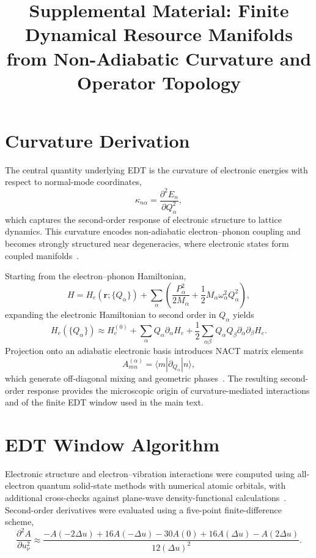 ﻿\documentclass[aps,prx,reprint,superscriptaddress,longbibliography,floatfix]{revtex4-2}
\begin{document}
\title{Supplemental Material: Finite Dynamical Resource Manifolds from Non-Adiabatic Curvature and Operator Topology}

\maketitle
\section{Curvature Derivation}

The central quantity underlying EDT is the curvature of electronic energies with respect to normal-mode coordinates,
\begin{equation}
\kappa_{n\alpha} = \frac{\partial^2 E_n}{\partial Q_\alpha^2},
\end{equation}
which captures the second-order response of electronic structure to lattice dynamics. This curvature encodes non-adiabatic electron--phonon coupling and becomes strongly structured near degeneracies, where electronic states form coupled manifolds~\cite{Giustino2017,Yarkony1996}.

Starting from the electron--phonon Hamiltonian,
\begin{equation}
H = H_e(\mathbf{r};\{Q_\alpha\}) + \sum_\alpha \left(\frac{P_\alpha^2}{2M_\alpha} + \frac{1}{2}M_\alpha\omega_\alpha^2 Q_\alpha^2\right),
\end{equation}
expanding the electronic Hamiltonian to second order in $Q_\alpha$ yields
\begin{equation}
H_e(\{Q_\alpha\}) \approx H_e^{(0)} + \sum_\alpha Q_\alpha \partial_\alpha H_e + \frac{1}{2}\sum_{\alpha\beta} Q_\alpha Q_\beta \partial_\alpha\partial_\beta H_e .
\end{equation}
Projection onto an adiabatic electronic basis introduces NACT matrix elements
\begin{equation}
A_{mn}^{(\alpha)} = \langle m | \partial_{Q_\alpha} | n \rangle,
\end{equation}
which generate off-diagonal mixing and geometric phases~\cite{Mead1979,Berry1984}. The resulting second-order response provides the microscopic origin of curvature-mediated interactions and of the finite EDT window used in the main text.


\section{EDT Window Algorithm}

Electronic structure and electron--vibration interactions were computed using all-electron quantum solid-state methods with numerical atomic orbitals, with additional cross-checks against plane-wave density-functional calculations~\cite{Blum2009,Giannozzi2009,Giannozzi2017}. Second-order derivatives were evaluated using a five-point finite-difference scheme,
\begin{equation}
\frac{\partial^2 A}{\partial u_\nu^2}
\approx
\frac{-A(-2\Delta u) + 16A(-\Delta u) - 30A(0) + 16A(\Delta u) - A(2\Delta u)}{12(\Delta u)^2}.
\end{equation}
\end{document}
